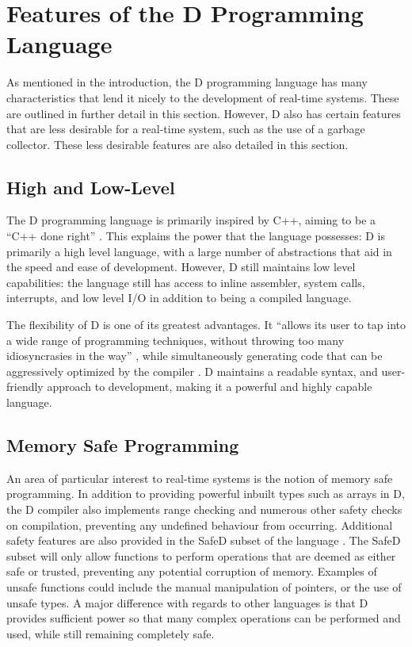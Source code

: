 


\section{Features of the D Programming Language}
As mentioned in the introduction, the D programming language has many 
characteristics that lend it nicely to the development of real-time systems.
These are outlined in further detail in this section. 
However, D also has certain features that are less desirable for a real-time 
system, such as the use of a garbage collector. These less desirable features 
are also detailed in this section.


\subsection{High and Low-Level}
The D programming language is primarily inspired by C++, aiming to be a ``C++ done
right'' 
\cite{qznc-tutorial}. This explains the 
power that the language possesses: D is primarily a high level language, with
a large number of abstractions that aid in the speed and ease of development. 
However, D still maintains low level capabilities: the language still has access 
to inline assembler, system calls, interrupts, and low level I/O in addition to 
being a compiled language.
\par\bigskip\noindent
The flexibility of D is one of its greatest advantages. It ``allows its user to tap 
into a wide range of programming techniques, without throwing too many 
idiosyncrasies in the way''
\cite{ddili-book}, 
while simultaneously generating code that can be aggressively optimized by the
compiler 
\cite{dlang-overview}. D maintains a readable syntax, and 
user-friendly approach to development, making it a powerful and highly capable 
language.

\subsection{Memory Safe Programming}
An area of particular interest to real-time systems is the notion of memory 
safe programming. In addition to providing powerful inbuilt types such as arrays 
in D, the D compiler also implements range checking and numerous other 
safety checks on compilation, preventing any undefined behaviour from occurring.
Additional safety features are also provided in the SafeD subset of the language
\cite{safe-d}. The SafeD subset will only allow functions to perform 
operations that are deemed as either safe or trusted, preventing any 
potential corruption of memory. Examples of unsafe functions could include the 
manual manipulation of pointers, or the use of unsafe types. A major difference 
with regards to other languages is that D provides sufficient power so that many complex 
operations can be performed and used, while still remaining completely safe.

